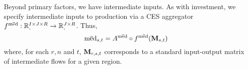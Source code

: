 \documentclass[12pt,a4paper,twoside, draft]{article}
\begin{document}
Beyond primary factors, we have intermediate inputs.
As with investment, we specify intermediate inputs to production via a CES
aggregator $f^{\med}: \nnreal^{I \times J \times R} \rightarrow
\nnreal^{J \times R}$.
Thus,
\begin{equation}\label{eq-ces-int}
  \textup{m}\overline{\textup{e}}\textup{d}_{{s}, t} = A^{\textup{m}\overline{\textup{e}}\textup{d}}
    \circ f^{\textup{m}\overline{\textup{e}}\textup{d}}(
      \mathbf{M}_{{s}, t}
      )
\end{equation}
where, for each $r, n$ and $t$, $\textbf{M}_{r, {s}, t}$
corresponds to a standard input-output matrix of intermediate flows for a given
region.
\end{document}
